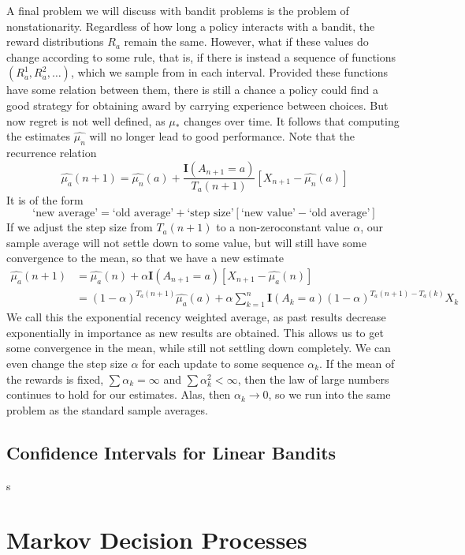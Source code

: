 A final problem we will discuss with bandit problems is the problem of nonstationarity. Regardless of how long a policy interacts with a bandit, the reward distributions $R_a$ remain the same. However, what if these values do change according to some rule, that is, if there is instead a sequence of functions $(R^1_a, R^2_a, \dots)$, which we sample from in each interval. Provided these functions have some relation between them, there is still a chance a policy could find a good strategy for obtaining award by carrying experience between choices. But now regret is not well defined, as $\mu_*$ changes over time. It follows that computing the estimates $\widehat{\mu_n}$ will no longer lead to good performance. Note that the recurrence relation
%
\[ \widehat{\mu_a}(n+1) = \widehat{\mu_n}(a) + \frac{\mathbf{I}(A_{n+1} = a)}{T_a(n+1)} [X_{n+1} - \widehat{\mu_n}(a)] \]
%
It is of the form
%
\[ \text{`new average'} = \text{`old average'} + \text{`step size'}[\text{`new value'} - \text{`old average'}] \]
%
If we adjust the step size from $T_a(n+1)$ to a non-zeroconstant value $\alpha$, our sample average will not settle down to some value, but will still have some convergence to the mean, so that we have a new estimate
%
\begin{align*}
    \widehat{\mu_a}(n+1) &= \widehat{\mu_a}(n) + \alpha \mathbf{I}(A_{n+1} = a) [X_{n+1} - \widehat{\mu_a}(n)]\\
    &= (1 - \alpha)^{T_a(n+1)} \widehat{\mu_a}(a) + \alpha \sum_{k = 1}^n \mathbf{I}(A_k = a) (1 - \alpha)^{T_a(n+1) - T_a(k)} X_k
\end{align*}
%
We call this the exponential recency weighted average, as past results decrease exponentially in importance as new results are obtained. This allows us to get some convergence in the mean, while still not settling down completely. We can even change the step size $\alpha$ for each update to some sequence $\alpha_k$. If the mean of the rewards is fixed, $\sum \alpha_k = \infty$ and $\sum \alpha_k^2 < \infty$, then the law of large numbers continues to hold for our estimates. Alas, then $\alpha_k \to 0$, so we run into the same problem as the standard sample averages.

\section{Confidence Intervals for Linear Bandits}

s

\chapter{Markov Decision Processes}

